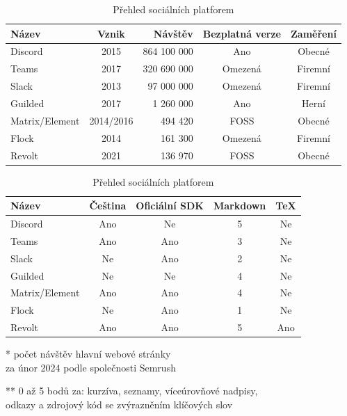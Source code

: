 \documentclass[FM]{tulthesis}
\begin{document}
	\begin{table}[ht]
		\centering
		\caption{Přehled sociálních platforem}\medskip
		\begin{threeparttable}
			\begin{tabular}{ l c r c c }
				\textbf{Název}&\textbf{Vznik}&\textbf{Návštěv}\tnote{*}&\textbf{Bezplatná verze}&\textbf{Zaměření}\\\hline
				Discord&2015&864 100 000&Ano&Obecné\\
				Teams&2017&320 690 000&Omezená&Firemní\\
				Slack&2013&97 000 000&Omezená&Firemní\\
				Guilded&2017&1 260 000&Ano&Herní\\				
				Matrix/Element&2014/2016&494 420&FOSS&Obecné\\				
				Flock&2014&161 300&Omezená&Firemní\\
				Revolt&2021&136 970&FOSS&Obecné\\
			\hline\end{tabular}
			\bigskip%
		
			\begin{tabular}{ l c c c c }
				\textbf{Název}&\textbf{Čeština}&\textbf{Oficiální SDK}&\textbf{Markdown}\tnote{**}&\textbf{TeX}\\\hline
				Discord&Ano&Ne&5&Ne\\
				Teams&Ano&Ano&3&Ne\\
				Slack&Ne&Ano&2&Ne\\
				Guilded&Ne&Ne&4&Ne\\				
				Matrix/Element&Ano&Ano&4&Ne\\				
				Flock&Ne&Ano&1&Ne\\
				Revolt&Ano&Ano&5&Ano\\
			\hline\end{tabular}			
			\begin{tablenotes}
				\item[*] počet návštěv hlavní webové stránky\\za únor 2024 podle společnosti Semrush\smallskip
				\item[**] 0 až 5 bodů za: kurzíva, seznamy, víceúrovňové nadpisy,\\odkazy a zdrojový kód se zvýrazněním klíčových slov
			\end{tablenotes}
		\end{threeparttable}
	\end{table}
	
\end{document}
